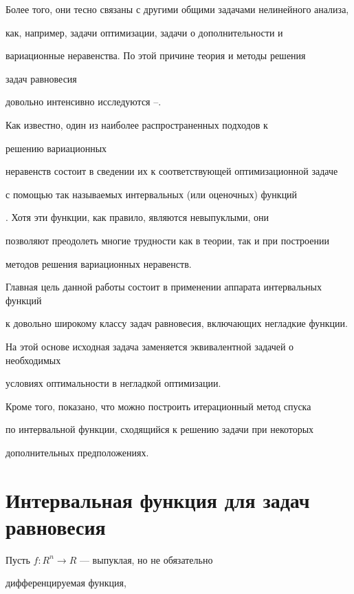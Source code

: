 Более того, они тесно связаны с другими общими задачами нелинейного анализа, 


как, например, задачи оптимизации, задачи о дополнительности и 


вариационные неравенства. По этой причине теория и методы решения 


задач равновесия


довольно интенсивно исследуются \cite{BC84}--\cite{KS00}.


Как известно, один из наиболее распространенных подходов к 


решению вариационных


неравенств состоит в сведении их к соответствующей оптимизационной задаче 


с помощью так называемых интервальных (или оценочных) функций


\cite{Pat97}. Хотя эти функции, как правило, являются невыпуклыми, они 


позволяют преодолеть многие трудности как в теории, так и при построении 


методов решения вариационных неравенств. 





Главная цель данной работы состоит в применении аппарата интервальных функций 


к довольно широкому классу задач равновесия, включающих негладкие функции. 


На этой основе исходная задача заменяется эквивалентной задачей о необходимых 


условиях оптимальности в негладкой оптимизации.


Кроме того, показано, что можно построить итерационный метод спуска 


по интервальной функции, сходящийся к решению задачи при некоторых 


дополнительных предположениях.








\section{Интервальная функция для задач равновесия}





Пусть $f : R^n \rightarrow R$ --- выпуклая, но не обязательно 


дифференцируемая функция, 


